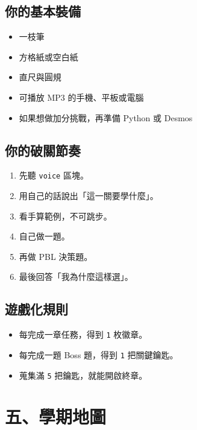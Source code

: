 \documentclass[
  chinese,
  12pt,
  a4paper,
  oneside]{article}
\providecommand{\tightlist}{%
  \setlength{\itemsep}{0pt}\setlength{\parskip}{0pt}}
\begin{document}
\subsection{你的基本裝備}\label{ux4f60ux7684ux57faux672cux88ddux5099}

\begin{itemize}
\tightlist
\item
  一枝筆
\item
  方格紙或空白紙
\item
  直尺與圓規
\item
  可播放 MP3 的手機、平板或電腦
\item
  如果想做加分挑戰，再準備 Python 或 Desmos
\end{itemize}

\subsection{你的破關節奏}\label{ux4f60ux7684ux7834ux95dcux7bc0ux594f}

\begin{enumerate}
\def\labelenumi{\arabic{enumi}.}
\tightlist
\item
  先聽 \texttt{voice} 區塊。
\item
  用自己的話說出「這一關要學什麼」。
\item
  看手算範例，不可跳步。
\item
  自己做一題。
\item
  再做 PBL 決策題。
\item
  最後回答「我為什麼這樣選」。
\end{enumerate}

\subsection{遊戲化規則}\label{ux904aux6232ux5316ux898fux5247}

\begin{itemize}
\tightlist
\item
  每完成一章任務，得到 \texttt{1} 枚徽章。
\item
  每完成一題 Boss 題，得到 \texttt{1} 把關鍵鑰匙。
\item
  蒐集滿 \texttt{5} 把鑰匙，就能開啟終章。
\end{itemize}

\section{五、學期地圖}\label{ux4e94ux5b78ux671fux5730ux5716}
\end{document}
